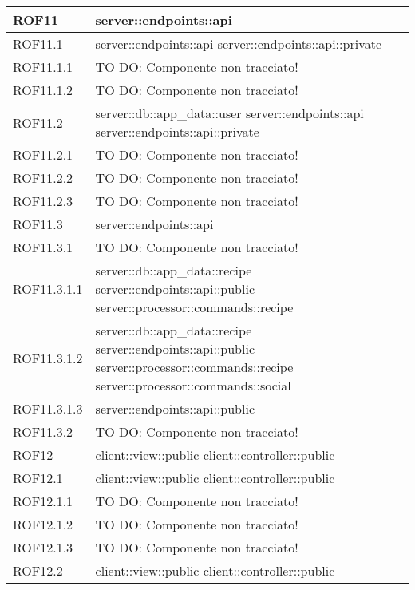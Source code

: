 \begin{center}
\begin{longtable}{| p{4cm} | p{8cm} |}
\hline
ROF11 & server::endpoints::api \\
\hline
ROF11.1 & server::endpoints::api \newline server::endpoints::api::private \\
\hline
ROF11.1.1 & TO DO: Componente non tracciato! \\
\hline
ROF11.1.2 & TO DO: Componente non tracciato! \\
\hline
ROF11.2 & server::db::app\_data::user \newline server::endpoints::api \newline server::endpoints::api::private \\
\hline
ROF11.2.1 & TO DO: Componente non tracciato! \\
\hline
ROF11.2.2 & TO DO: Componente non tracciato! \\
\hline
ROF11.2.3 & TO DO: Componente non tracciato! \\
\hline
ROF11.3 & server::endpoints::api \\
\hline
ROF11.3.1 & TO DO: Componente non tracciato! \\
\hline
ROF11.3.1.1 & server::db::app\_data::recipe \newline server::endpoints::api::public \newline server::processor::commands::recipe \\
\hline
ROF11.3.1.2 & server::db::app\_data::recipe \newline server::endpoints::api::public \newline server::processor::commands::recipe \newline server::processor::commands::social \\
\hline
ROF11.3.1.3 & server::endpoints::api::public \\
\hline
ROF11.3.2 & TO DO: Componente non tracciato! \\
\hline
ROF12 & client::view::public \newline client::controller::public \\
\hline
ROF12.1 & client::view::public \newline client::controller::public \\
\hline
ROF12.1.1 & TO DO: Componente non tracciato! \\
\hline
ROF12.1.2 & TO DO: Componente non tracciato! \\
\hline
ROF12.1.3 & TO DO: Componente non tracciato! \\
\hline
ROF12.2 & client::view::public \newline client::controller::public \\

\end{longtable}
\end{center}
